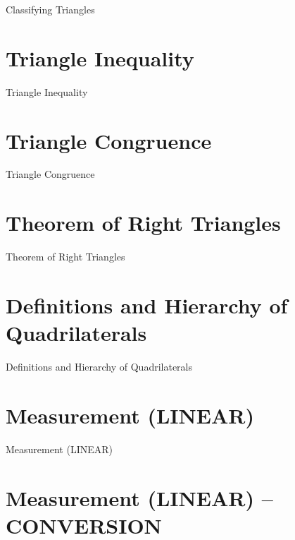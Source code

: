 Classifying Triangles

\section{Triangle Inequality}
\label{sec:triangle-inequality}

Triangle Inequality

\section{Triangle Congruence}
\label{sec:triangle-congruence}

Triangle Congruence

\section{Theorem of Right Triangles}
\label{sec:theorem-of-right-triangles}

Theorem of Right Triangles

\section{Definitions and Hierarchy of Quadrilaterals}
\label{sec:definitions-and-hierarchy-of-quadrilaterals}

Definitions and Hierarchy of Quadrilaterals

\section{Measurement (LINEAR)}
\label{sec:measurement-linear}

Measurement (LINEAR)

\section{Measurement (LINEAR) – CONVERSION}
\label{sec:measurement-linear-conversion}

